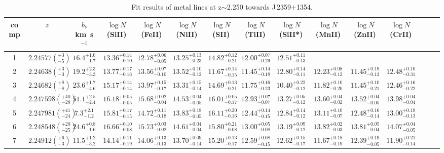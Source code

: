 \documentclass[fleqn,usenatbib,useAMS]{mnras}
\begin{document}
\begin{landscape}
\begin{table}
  \caption{Fit results of metal lines at z$\sim$2.250 towards J\,2359$+$1354.}\label{tab:fit_me_J2359}
\begin{tabular}{ccccccccccccccc}
\hline %
comp & $z$ & $b$, km~s$^{-1}$ & $\log N$(SiII) & $\log N$(FeII) & $\log N$(NiII) & $\log N$(SII) & $\log N$(TiII) & $\log N$(SiII*) & $\log N$(MnII) & $\log N$(ZnII) & $\log N$(CrII) \\
\hline
1 & $2.24577(^{+3}_{-5})$ & $16.4^{+1.0}_{-1.7}$ & $13.36^{+0.14}_{-0.10}$ & $12.78^{+0.06}_{-0.05}$ & $13.25^{+0.13}_{-0.23}$ & $14.82^{+0.12}_{-0.21}$ & $12.00^{+0.07}_{-0.29}$ & $12.51^{+0.11}_{-0.13}$ &  &  &  \\
2 & $2.24638(^{+3}_{-3})$ & $19.2^{+2.3}_{-3.3}$ & $13.77^{+0.17}_{-0.16}$ & $13.56^{+0.07}_{-0.10}$ & $13.52^{+0.10}_{-0.12}$ & $11.67^{+0.14}_{-0.15}$ & $11.45^{+0.14}_{-0.18}$ & $12.80^{+0.14}_{-0.11}$ & $12.23^{+0.08}_{-0.12}$ & $11.45^{+0.19}_{-0.13}$ & $12.48^{+0.10}_{-0.31}$ \\
3 & $2.24682(^{+8}_{-8})$ & $23.6^{+1.7}_{-4.6}$ & $15.17^{+0.14}_{-0.14}$ & $13.97^{+0.15}_{-0.17}$ & $13.31^{+0.15}_{-0.14}$ & $14.69^{+0.13}_{-0.21}$ & $11.75^{+0.16}_{-0.23}$ & $10.40^{+0.22}_{-0.12}$ & $11.82^{+0.10}_{-0.20}$ & $11.45^{+0.10}_{-0.21}$ & $12.46^{+0.16}_{-0.22}$ \\
4 & $2.247598(^{+40}_{-28})$ & $51.1^{+2.5}_{-2.4}$ & $16.18^{+0.05}_{-0.05}$ & $15.68^{+0.02}_{-0.04}$ & $14.53^{+0.04}_{-0.05}$ & $16.01^{+0.05}_{-0.17}$ & $12.93^{+0.07}_{-0.07}$ & $13.27^{+0.05}_{-0.12}$ & $13.60^{+0.04}_{-0.02}$ & $13.52^{+0.04}_{-0.05}$ & $13.98^{+0.04}_{-0.04}$ \\
5 & $2.247981(^{+41}_{-24})$ & $7.3^{+2.1}_{-1.2}$ & $15.81^{+0.17}_{-0.15}$ & $14.72^{+0.11}_{-0.18}$ & $13.83^{+0.18}_{-0.05}$ & $16.11^{+0.20}_{-0.16}$ & $12.44^{+0.14}_{-0.15}$ & $12.84^{+0.14}_{-0.12}$ & $13.11^{+0.10}_{-0.07}$ & $12.48^{+0.16}_{-0.14}$ & $13.00^{+0.18}_{-0.13}$ \\
6 & $2.248548(^{+20}_{-25})$ & $24.6^{+0.8}_{-1.6}$ & $16.66^{+0.10}_{-0.08}$ & $15.73^{+0.03}_{-0.02}$ & $14.61^{+0.04}_{-0.04}$ & $15.80^{+0.21}_{-0.08}$ & $13.00^{+0.05}_{-0.08}$ & $13.19^{+0.09}_{-0.12}$ & $13.82^{+0.02}_{-0.03}$ & $13.81^{+0.05}_{-0.04}$ & $14.07^{+0.04}_{-0.05}$ \\
7 & $2.24912(^{+6}_{-3})$ & $11.5^{+1.2}_{-3.2}$ & $14.14^{+0.11}_{-0.19}$ & $14.06^{+0.13}_{-0.13}$ & $13.70^{+0.09}_{-0.14}$ & $15.20^{+0.13}_{-0.17}$ & $12.59^{+0.08}_{-0.15}$ & $12.62^{+0.15}_{-0.17}$ & $11.67^{+0.18}_{-0.19}$ & $12.39^{+0.19}_{-0.05}$ & $11.90^{+0.21}_{-0.14}$ \\

\end{tabular}
\end{table}
\end{landscape}
\end{document}
